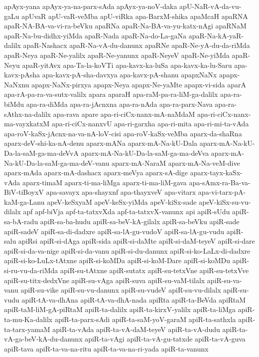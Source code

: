 {apAyx-yana
apAyx-ya-na-parx-sAda
apAyx-ya-noV-daka
apU-NaR-vA-da-vu-gaLu
apUvaR
apU-vaR-veMba
apU-viRka
apa-BarxM-shika
apaMcaH
apaRNA
apaR-NA-BA-va-vi-ra-beVku
apaRNa
apaR-Na-BA-va-yu-katx-nAgi
apaRNaM
apaR-Na-bu-didhx-yiMda
apaR-Nada
apaR-Na-do-La-gaNa
apaR-Na-kA-yaR-dalilx
apaR-Nashacx
apaR-Na-vA-du-danunx
apaRNe
apaR-Ne-yA-du-da-riMda
apaR-Neya
apaR-Ne-yalilx
apaR-Ne-yanunx
apaR-NeyeV
apaR-Ne-yiMda
apaR-Neyu
apaR-yitAvx
apa-Ta-la-koVTi
apa-kavx-ka-luSa
apa-kavx-ka-lu-Saru
apa-kavx-pAsha
apa-kavx-pA-sha-davxya
apa-kavx-pA-shanu
apapxNaNx
apapx-NaNxnu
apapx-NaNx-pirxya
apapx-Neya
apapx-Ne-yaMte
apapx-vi-sida
aparA
apa-rA-pa-ra-va-sutx-valilx
apara
aparaH
apa-raM-pa-ra-liM-ga-dalilx
apa-ra-biMdu
apa-ra-diMda
apa-ra-jAcnxna
apa-ra-nAda
apa-ra-parx-Nava
apa-ra-sAthx-na-dalilx
apa-rava
apare
apa-ri-ciCx-nanx-mA-naMdaM
apa-ri-ciCx-nanx-ma-vayxkatxM
apa-ri-ciCx-nanxvU
apa-ri-garxha
apa-ri-mita
apa-ri-mi-ta-vAda
apa-roV-kaSx-jAcnx-na-va-nA-loV-cisi
apa-roV-kaSx-veMba
aparx-da-shaRna
aparx-deV-shi-ka-nA-denu
aparx-mANa
aparx-mA-Na-kU-Dala
aparx-mA-Na-kU-Da-la-saM-ga-ma-deVvA
aparx-mA-Na-kU-Da-la-saM-ga-ma-deVva
aparx-mA-Na-kU-Da-la-saM-ga-ma-deV-vanu
aparx-mA-NaraM
aparx-mA-Na-veM-dive
aparx-mAda
aparx-mA-dashacx
aparx-meVya
aparx-sA-dige
aparx-tayx-kaSx-vAda
aparx-timaM
aparx-ti-ma-liMga
aparx-ti-ma-liM-gava
apa-sAmx-ra-Ba-va-BiV-tiBoyxV
apa-savayx
apa-shayxnf
apa-thayxveV
apa-vitarx
apa-vi-tarx-pA-kaM-ga-Lanu
apeV-keSxyaM
apeV-keSx-yiMda
apeV-kiSx-sade
apeV-kiSx-su-vu-dilalx
apf
apf-biVja
apf-ta-tatxvXda
apf-ta-tatxvX-vanunx
api
apiR-sUdu
apiR-sa-bA-radu
apiR-sa-ba-hudu
apiR-sa-beV-kA-gilalx
apiR-sa-beVku
apiR-sade
apiR-sadeV
apiR-sa-di-dadxre
apiR-sa-lA-gu-vudoV
apiR-sa-lA-gu-vudu
apiR-salu
apiRsi
apiR-si-dAga
apiR-sida
apiR-si-daMte
apiR-si-daM-teyeV
apiR-si-dare
apiR-si-da-va-nige
apiR-si-da-vanu
apiR-si-du-danunx
apiR-si-ko-LaLx-di-dadxre
apiR-si-ko-LuLx-tAtxne
apiR-si-koMDa
apiR-si-koM-Dare
apiR-si-koMDu
apiR-si-ru-vu-da-riMda
apiR-su-tAtxne
apiR-sutatx
apiR-su-tetxVne
apiR-su-tetxVve
apiR-su-titx-dedxVne
apiR-su-vAga
apiR-suva
apiR-su-vaM-tilalx
apiR-su-va-vanu
apiR-su-vike
apiR-su-vu-danunx
apiR-su-vudeV
apiR-su-vu-dilalx
apiR-su-vudu
apiR-tA-va-dhAna
apiR-tA-va-dhA-nada
apiRta
apiR-ta-BeVda
apiRtaM
apiR-taM-liM-gA-piRtaM
apiR-ta-dalilx
apiR-ta-kirxV-yalilx
apiR-ta-liMga
apiR-ta-mu-Ka-dalilx
apiR-ta-parx-sAdi
apiR-ta-saM-yoV-garaM
apiR-ta-sathxla
apiR-ta-tarx-yamaM
apiR-ta-vAda
apiR-ta-vA-daM-teyeV
apiR-ta-vA-dudu
apiR-ta-vA-ga-beV-kA-du-danunx
apiR-ta-vAgi
apiR-ta-vA-gu-tatxde
apiR-ta-vA-guva
apiR-tava
apiR-ta-va-na-ritu
apiR-ta-va-na-ri-yada
apiR-ta-vanunx
}
